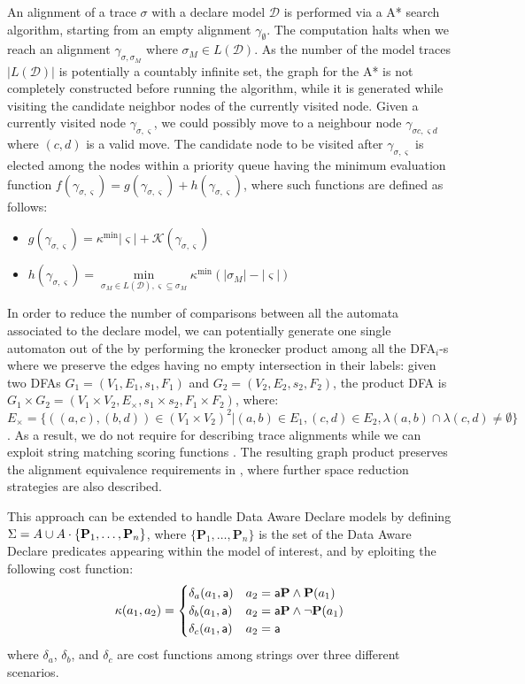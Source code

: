An alignment of a trace $\sigma$ with a declare model $\mathcal{D}$ is performed via a A* search algorithm, starting from an empty alignment $\gamma_\emptyset$. The computation halts when we reach an alignment $\gamma_{\sigma,\sigma_M}$ where $\sigma_M\in L(\mathcal{D})$. As the number of the model traces  $|L(\mathcal{D})|$  is potentially a countably infinite set, the graph for the A* is not completely constructed before running the algorithm, while it is generated while visiting the candidate neighbor nodes of the currently visited node. Given a currently visited node $\gamma_{\sigma,\varsigma}$, we could possibly move to a neighbour node $\gamma_{\sigma c,\varsigma d}$ where $(c,d)$ is a valid move. The candidate node to be visited after $\gamma_{\sigma,\varsigma}$ is elected among the nodes within a priority queue having the minimum evaluation function $f(\gamma_{\sigma,\varsigma})=g(\gamma_{\sigma,\varsigma})+h(\gamma_{\sigma,\varsigma})$, where such functions are defined as follows:
\begin{itemize}
	\item $g(\gamma_{\sigma,\varsigma})=\kappa^{\min}|\varsigma|+\mathcal{K}(\gamma_{\sigma,\varsigma})$
	\item $h(\gamma_{\sigma,\varsigma})=\underset{\sigma_M\in L (\mathcal{D}),\varsigma\subseteq\sigma_M }{\min}\kappa^{\min}(|\sigma_M|-|\varsigma|)$
\end{itemize}
In order to reduce the number of comparisons between all the automata associated to the declare model, we can potentially generate one single automaton out of the  by performing the kronecker product among all the DFA$_i$-s \cite{DBLP:conf/edbt/BergamiMM17} where we preserve the edges having no empty intersection in their labels: given two DFAs $G_1=(V_1,E_1,s_1,F_1)$ and $G_2=(V_2,E_2,s_2,F_2)$, the product DFA is $G_1\times G_2=(V_1\times V_2, E_\times,s_1\times s_2,F_1\times F_2)$, where: $E_\times = \{((a,c),(b,d))\in (V_1\times V_2)^2|(a,b)\in E_1,(c,d)\in E_2,\lambda(a,b)\cap\lambda(c,d)\neq\emptyset\}$. As a result, we do not require 
\checkmark for describing trace alignments while we can exploit string matching scoring functions \cite{CAiSE21}. The resulting graph product preserves the alignment equivalence requirements in \cite{LeoniMA12}, where further space reduction strategies are also described. 

This approach can be extended to handle Data Aware Declare models by defining $\Sigma=A\cup A\cdot\{\mathbf{P}_1,\dots,\mathbf{P}_n\}$, where $\{\mathbf{P}_1,\dots,\mathbf{P}_n\}$ is the set of the Data Aware Declare predicates appearing within the model of interest, and by eploiting the following cost function:
\[\kappa(a_1,a_2)=\begin{cases}
	\delta_a(a_1, \mathsf{a}) &  a_2=\mathsf{a}\mathbf{P} \wedge \mathbf{P}(a_1)\\
	\delta_b(a_1, \mathsf{a}) &  a_2=\mathsf{a}\mathbf{P} \wedge \neg\mathbf{P}(a_1)\\
	\delta_c(a_1,\mathsf{a}) & a_2=\mathsf{a} \\
\end{cases}\]
where $\delta_a$, $\delta_b$, and $\delta_c$ are cost functions among strings over three different scenarios. 

